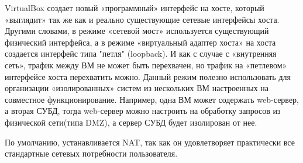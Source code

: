 \begin{itemize}
{VirtualBox создает новый «программный» интерфейс на хосте, который «выглядит» так же как и реально существующие сетевые интерфейсы хоста. Другими словами, в режиме «сетевой мост» используется существующий физический интерфейса, а в режиме «виртуальный адаптер хоста» на хоста создается интерфейс типа "петля" (loopback). И как с случае с «внутренняя сеть», трафик между ВМ не может быть перехвачен, но трафик на «петлевом» интерфейсе хоста перехватить можно. Данный режим полезно использовать для организации «изолированных» систем из нескольких ВМ настроенных на совместное функционирование. Например, одна ВМ может содержать web-сервер, а вторая СУБД, тогда web-сервер можно настроить на обработку запросов из физической сети(типа DMZ), а сервер СУБД будет изолирован от нее.
}
\end{itemize}

По умолчанию, устанавливается NAT, так как он удовлетворяет практически все стандартные сетевых потребности пользователя.